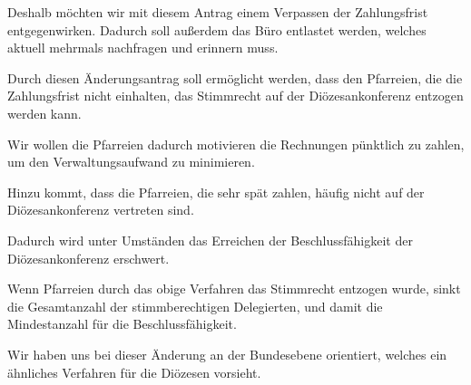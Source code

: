 \documentclass[12pt]{report}
\begin{document}
\begin{flushleft}
Deshalb  möchten wir mit diesem Antrag einem Verpassen der Zahlungsfrist entgegenwirken.
Dadurch soll außerdem das Büro entlastet werden, welches aktuell mehrmals nachfragen und erinnern muss.

Durch diesen Änderungsantrag soll ermöglicht werden, dass den Pfarreien, die die Zahlungsfrist nicht einhalten, das Stimmrecht auf der Diözesankonferenz entzogen werden kann.

Wir wollen die Pfarreien dadurch motivieren die Rechnungen pünktlich zu zahlen, um den Verwaltungsaufwand zu minimieren.

Hinzu kommt, dass die Pfarreien, die sehr spät zahlen, häufig nicht auf der Diözesankonferenz vertreten sind.

Dadurch wird unter Umständen das Erreichen der Beschlussfähigkeit der Diözesankonferenz erschwert.

Wenn Pfarreien durch das obige Verfahren das Stimmrecht entzogen wurde, sinkt die Gesamtanzahl der stimmberechtigen Delegierten, und damit die Mindestanzahl für die Beschlussfähigkeit.

Wir haben uns bei dieser Änderung an der Bundesebene orientiert, welches ein ähnliches Verfahren für die Diözesen vorsieht.


\end{flushleft}
\end{document}
